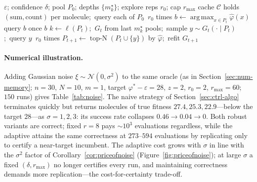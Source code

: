 \documentclass[11pt,a4paper]{article}
\newcommand{\phist}{\varphi^*}
\DeclareMathOperator*{\argmax}{arg\,max}
\DeclareMathOperator{\topN}{top\text{-}N}
\newcommand{\cache}{\mathcal{C}}
\begin{document}
\begin{algorithm}[ht]
\caption{Robust EM-SGS (R-EM-SGS), noisy oracle}\label{alg:remsgs}
\begin{algorithmic}[1]
\Require $\varepsilon$; confidence $\delta$; pool $P_0$; depths $\{m_k^\star\}$; explore reps $r_0$; cap $r_{\max}$
\State cache $\cache$ holds $(\text{sum},\text{count})$ per molecule;\ query each of $P_0$ $\,r_0$ times
\Repeat
  \State $b\leftarrow\argmax_{x\in P_t}\widehat\varphi(x)$
  \While{$\widehat\varphi(b)\ge\phist-\varepsilon$ \textbf{and} $\mathrm{LCB}(b)<\phist-\varepsilon$ \textbf{and} $\mathrm{count}(b)<r_{\max}$}
    \State query $b$ once
  \EndWhile
  \If{$\mathrm{LCB}(b)\ge\phist-\varepsilon$}
    \Return $b$ 
  \EndIf
  \State $k\leftarrow\ell(P_t)$;\ $G_t$ from last $m_k^\star$ pools;\ sample $y\sim G_t(\cdot\mid P_t)$;\ query $y$ $\,r_0$ times
  \State $P_{t+1}\leftarrow\topN(P_t\cup\{y\})$ by $\widehat\varphi$;\ refit $G_{t+1}$
\end{algorithmic}
\end{algorithm}

\paragraph{Numerical illustration.}
Adding Gaussian noise $\xi\sim\mathcal N(0,\sigma^2)$ to the same oracle
(as in Section~\ref{sec:num-memory}; $n=30$, $N=10$, $m=1$, target
$\phist-\varepsilon=28$, $z=2$, $r_0=2$, $r_{\max}=60$; $150$ runs) gives
Table~\ref{tab:noise}.  The naive strategy of Section~\ref{sec:ctrl-algo} terminates
quickly but returns molecules of true fitness $27.4,25.3,22.9$---below the
target $28$---as $\sigma=1,2,3$: its success rate collapses
$0.46\!\to\!0.04\!\to\!0$.  Both robust variants are correct; fixed
$r=8$ pays $\sim\!10^3$ evaluations regardless, while the adaptive
 attains the same correctness at $273$--$594$ evaluations by
replicating only to certify a near-target incumbent.  The adaptive cost
grows with $\sigma$ in line with the $\sigma^2$ factor of
Corollary~\ref{cor:priceofnoise} (Figure~\ref{fig:priceofnoise}); at large $\sigma$ a
fixed $(\delta,r_{\max})$ no longer certifies every run, and maintaining
correctness demands more replication---the cost-for-certainty trade-off.
\end{document}
